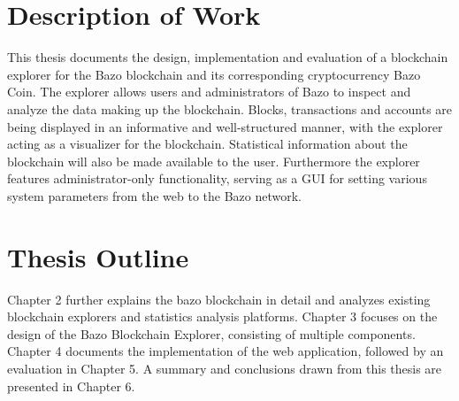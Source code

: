 \section{Description of Work}
This thesis documents the design, implementation and evaluation of a blockchain explorer for the Bazo blockchain and its corresponding cryptocurrency Bazo Coin. The explorer allows users and administrators of Bazo to inspect and analyze the data making up the blockchain. Blocks, transactions and accounts are being displayed in an informative and well-structured manner, with the explorer acting as a visualizer for the blockchain. Statistical information about the blockchain will also be made available to the user. Furthermore the explorer features administrator-only functionality, serving as a GUI for setting various system parameters from the web to the Bazo network.

\section{Thesis Outline}
Chapter 2 further explains the bazo blockchain in detail and analyzes existing blockchain explorers and statistics analysis platforms. Chapter 3 focuses on the design of the Bazo Blockchain Explorer, consisting of multiple components. Chapter 4 documents the implementation of the web application, followed by an evaluation in Chapter 5. A summary and conclusions drawn from this thesis are presented in Chapter 6.